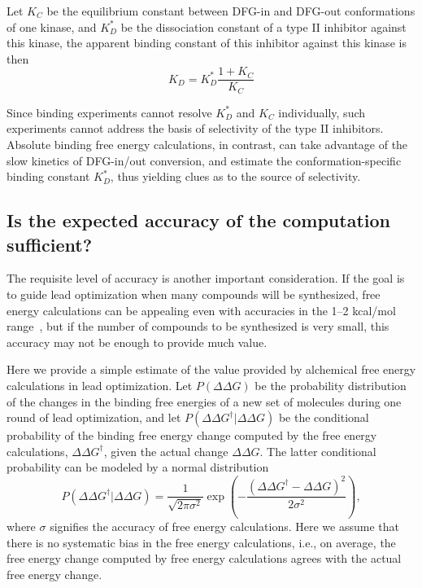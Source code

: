\documentclass[9pt,bestpractices]{livecoms}
\begin{document}
Let
$K_C$ be the equilibrium constant between DFG-in and DFG-out
conformations of one kinase, and $K_D^\ast$ be the dissociation
constant of a type II inhibitor against this kinase, the apparent
binding constant of this inhibitor against this kinase is then
\begin{equation}
  K_D = K_D^\ast \frac{1 + K_C}{K_C}
  \label{eqn:conformational-binding}
\end{equation}

Since binding experiments cannot resolve $K_D^\ast$ and $K_C$ individually, such experiments cannot address the basis of selectivity of the type II inhibitors. Absolute binding free energy calculations, in contrast, can take advantage of the slow kinetics of DFG-in/out conversion, and estimate the conformation-specific binding constant $K_D^\ast$, thus yielding clues as to the source of selectivity.

\subsection{Is the expected accuracy of the computation sufficient?}
\label{subsec:accuracy}
The requisite level of accuracy is another important consideration. If the
goal is to guide lead optimization when many compounds will be
synthesized, free energy calculations can be appealing even with
accuracies in the 1--2 kcal/mol range~\cite{mobley2012perspective}, but if the number of compounds to be synthesized is very small, this accuracy may not be enough to provide much value.

Here we provide a simple estimate of the value provided by alchemical
free energy calculations in lead optimization. Let $P(\Delta\Delta
G)$ be the probability distribution of the changes in the binding free
energies of a new set of molecules during one round of lead
optimization, and let $P(\Delta\Delta G^\dagger|\Delta\Delta G)$ be the
conditional probability of the binding free energy change computed by
the free energy calculations, $\Delta\Delta G^\dagger$, given the actual
change $\Delta\Delta G$. The latter conditional probability can be modeled
by a normal distribution
\begin{equation}
  P(\Delta\Delta G^\dagger|\Delta\Delta G) = \frac{1}{\sqrt{2\pi\sigma^2}}
  \exp\left(-\frac{(\Delta\Delta G^\dagger - \Delta\Delta G)^2}{2\sigma^2}\right),
  \label{eqn:free-energy-distribution}
\end{equation}
where $\sigma$ signifies the accuracy of free energy calculations.
Here we assume that there is no systematic bias in the free energy
calculations, i.e., on average, the free energy change computed by
free energy calculations agrees with the actual free energy change.
\end{document}
